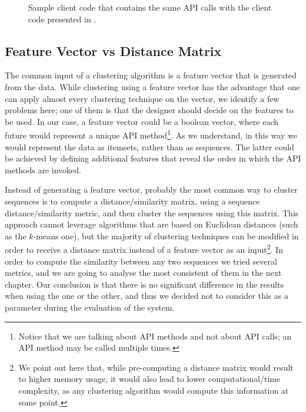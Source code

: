 \vspace{-10pt}

\begin{figure}[H]

\vspace{-10pt}
\caption[Sample client code 2]{Sample client code that contains the same API calls with the client code presented in .}
\label{listings:cluster-snippet2}
\end{figure}

\vspace{-20pt}

\subsection{Feature Vector vs Distance Matrix}
\label{subsec:feature-extraction}

The common input of a clustering algorithm is a feature vector that is generated from the data. While clustering using a feature vector has the advantage that one can apply almost every clustering technique on the vector, we identify a few problems here; one of them is that the designer should decide on the features to be used. In our case, a feature vector could be a boolean vector, where each future would represent a unique API method\footnote{Notice that we are talking about API methods and not about API calls; an API method may be called multiple times.}. As we understand, in this way we would represent the data as itemsets, rather than as sequences. The latter could be achieved by defining additional features that reveal the order in which the API methods are invoked.

Instead of generating a feature vector, probably the most common way to cluster sequences is to compute a distance/similarity matrix, using a sequence distance/similarity metric, and then cluster the sequences using this matrix. This approach cannot leverage algorithms that are based on Euclidean distances (such as the $k$-means one), but the majority of clustering techniques can be modified in order to receive a distance matrix instead of a feature vector as an input\footnote{We point out here that, while pre-computing a distance matrix would result to higher memory usage, it would also lead to lower computational/time complexity, as any clustering algorithm would compute this information at some point.}. In order to compute the similarity between any two sequences we tried several metrics, and we are going to analyse the most consistent of them in the next chapter. Our conclusion is that there is no significant difference in the results when using the one or the other, and thus we decided not to consider this as a parameter during the evaluation of the system.


